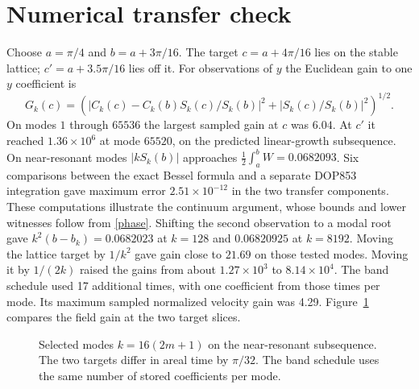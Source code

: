 \documentclass[11pt]{article}
\begin{document}
\section{Numerical transfer check}
Choose $a=\pi/4$ and $b=a+3\pi/16$. The target $c=a+4\pi/16$
lies on the stable lattice; $c'=a+3.5\pi/16$ lies off it.
For observations of $y$ the Euclidean gain to one $y$ coefficient is
\[
 G_k(c)=\left(\left|C_k(c)-C_k(b)S_k(c)/S_k(b)\right|^2+
                      \left|S_k(c)/S_k(b)\right|^2\right)^{1/2}.
\]
On modes $1$ through $65536$ the largest sampled gain at $c$ was
$6.04$. At $c'$ it reached $1.36\times10^6$ at mode $65520$,
on the predicted linear-growth subsequence. On near-resonant modes
$|kS_k(b)|$ approaches $\frac12\int_a^b W=0.0682093$.
Six comparisons between the exact Bessel formula and a separate
DOP853 integration gave maximum error $2.51\times10^{-12}$ in
the two transfer components. These computations illustrate
the continuum argument, whose bounds and lower witnesses follow
from \eqref{phase}. Shifting the second observation to a modal
root gave $k^2(b-b_k)=0.0682023$ at $k=128$ and $0.06820925$
at $k=8192$. Moving the lattice target by $1/k^2$ gave gain
close to $21.69$ on those tested modes. Moving it by $1/(2k)$
raised the gains from about $1.27\times10^3$ to $8.14\times10^4$.
The band schedule used 17 additional times, with one coefficient
from those times per mode. Its maximum sampled normalized
velocity gain was 4.29. Figure~\ref{fig:gains} compares the
field gain at the two target slices.
\begin{figure}[ht]
\centering
{}
\caption{Selected modes $k=16(2m+1)$ on the near-resonant subsequence.
The two targets differ in areal time by $\pi/32$.
The band schedule uses the same number of stored coefficients per mode.}
\label{fig:gains}
\end{figure}
\end{document}
